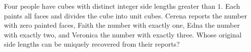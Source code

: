 Four people have cubes with distinct integer side lengths greater than $1$. Each paints all faces and divides the cube into unit cubes. Cerena reports the number with zero painted faces, Faith the number with exactly one, Edna the number with exactly two, and Veronica the number with exactly three. Whose original side lengths can be uniquely recovered from their reports?
